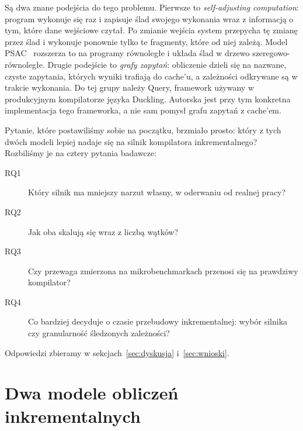 \documentclass[11pt,a4paper]{article}
\begin{document}
Są dwa znane podejścia do tego problemu. Pierwsze to \emph{self-adjusting
computation}: program wykonuje się raz i zapisuje ślad swojego wykonania wraz
z informacją o tym, które dane wejściowe czytał. Po zmianie wejścia system
przepycha tę zmianę przez ślad i wykonuje ponownie tylko te fragmenty, które od
niej zależą. Model PSAC~\cite{psac2021} rozszerza to na programy równoległe
i układa ślad w drzewo szeregowo-równoległe. Drugie podejście to \emph{grafy
zapytań}: obliczenie dzieli się na nazwane, czyste zapytania, których wyniki
trafiają do cache'u, a zależności odkrywane są w trakcie wykonania. Do tej grupy
należy Query, framework używany w produkcyjnym kompilatorze języka Duckling. %
Autorska jest przy tym konkretna implementacja tego frameworka, a nie sam pomysł
grafu zapytań z cache'em.

Pytanie, które postawiliśmy sobie na początku, brzmiało prosto: który z tych
dwóch modeli lepiej nadaje się na silnik kompilatora inkrementalnego? Rozbiliśmy
je na cztery pytania badawcze:

\begin{description}
  \item[RQ1] Który silnik ma mniejszy narzut własny, w oderwaniu od realnej pracy?
  \item[RQ2] Jak oba skalują się wraz z liczbą wątków?
  \item[RQ3] Czy przewaga zmierzona na mikrobenchmarkach przenosi się na
        prawdziwy kompilator?
  \item[RQ4] Co bardziej decyduje o czasie przebudowy inkrementalnej: wybór
        silnika czy granularność śledzonych zależności?
\end{description}

Odpowiedzi zbieramy w sekcjach~\ref{sec:dyskusja} i~\ref{sec:wnioski}. %

\section{Dwa modele obliczeń inkrementalnych}
\label{sec:modele}
\end{document}
